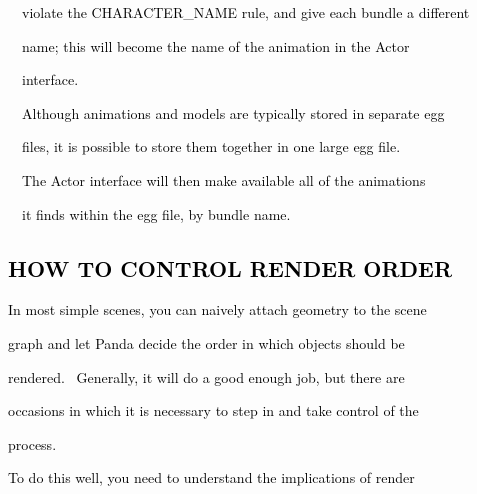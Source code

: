 \documentclass[a4paper]{article}
\newcommand\textstyleOOoComputerKeyWord[1]{\textrm{\textcolor[rgb]{0.0,0.0,0.5019608}{#1}}}
\begin{document}
{\color{black}
\textstyleOOoComputerKeyWord{\textcolor{black}{\ \ violate the CHARACTER\_NAME rule, and give each bundle a different}}}

{\color{black}
\textstyleOOoComputerKeyWord{\textcolor{black}{\ \ name; this will become the name of the animation in the Actor}}}

{\color{black}
\textstyleOOoComputerKeyWord{\textcolor{black}{\ \ interface.}}}


\bigskip

{\color{black}
\textstyleOOoComputerKeyWord{\textcolor{black}{\ \ Although animations and models are typically stored in separate
egg}}}

{\color{black}
\textstyleOOoComputerKeyWord{\textcolor{black}{\ \ files, it is possible to store them together in one large egg
file.}}}

{\color{black}
\textstyleOOoComputerKeyWord{\textcolor{black}{\ \ The Actor interface will then make available all of the animations}}}

{\color{black}
\textstyleOOoComputerKeyWord{\textcolor{black}{\ \ it finds within the egg file, by bundle name.}}}


\bigskip

\clearpage\subsection[HOW TO CONTROL RENDER ORDER]{\textstyleOOoComputerKeyWord{\textcolor{black}{HOW TO CONTROL RENDER
ORDER}}}
\hypertarget{RefHeading7731869075401}{}
\bigskip

{\color{black}
\textstyleOOoComputerKeyWord{\textcolor{black}{In most simple scenes, you can naively attach geometry to the scene}}}

{\color{black}
\textstyleOOoComputerKeyWord{\textcolor{black}{graph and let Panda decide the order in which objects should be}}}

{\color{black}
\textstyleOOoComputerKeyWord{\textcolor{black}{rendered. \ Generally, it will do a good enough job, but there are}}}

{\color{black}
\textstyleOOoComputerKeyWord{\textcolor{black}{occasions in which it is necessary to step in and take control of the}}}

{\color{black}
\textstyleOOoComputerKeyWord{\textcolor{black}{process.}}}


\bigskip

{\color{black}
\textstyleOOoComputerKeyWord{\textcolor{black}{To do this well, you need to understand the implications of render}}}
\end{document}
